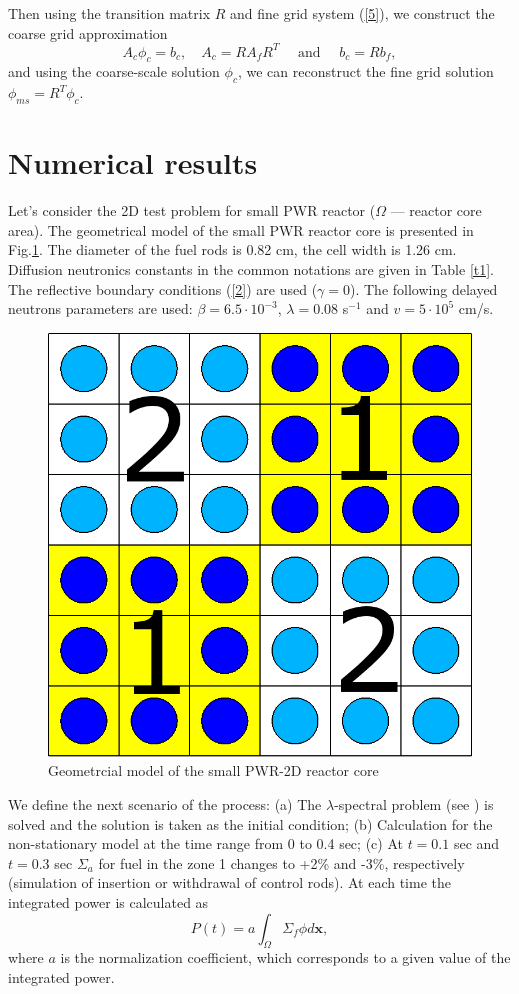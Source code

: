 \documentclass[runningheads]{llncs}
\begin{document}
Then using the transition matrix $R$ and fine grid system (\ref{5}), we construct the coarse grid approximation
\begin{equation}\label{9}
A_c \phi_c = b_c, \quad 
A_c = R A_f R^T 
\quad \text{ and } \quad 
b_c = R b_f,
\end{equation}  
and using the coarse-scale solution $\phi_c$, we can  reconstruct the fine grid solution $\phi_{ms} = R^T \phi_c$.

\section{Numerical results}
Let's consider the 2D test problem for small PWR reactor ($\Omega$ --- reactor core area). 
The geometrical model of the small PWR reactor core is presented in Fig.\ref{p3}. 
The diameter of the fuel rods is 0.82 cm, the cell width is 1.26 cm.
Diffusion neutronics constants in the common notations are given in Table \ref{t1}. 
The reflective boundary conditions (\ref{2}) are used ($\gamma = 0$).
The following delayed neutrons parameters are used: $\beta = 6.5 \cdot 10^{-3}$, $\lambda = 0.08$ s$^{-1}$ and $v = 5 \cdot 10^5$ cm/s.

\begin{figure}[h]
  \begin{center}
    \includegraphics[width=0.4\linewidth] {smallpwr.png}
	\caption{Geometrcial model of the small PWR-2D reactor core}
	\label{p3}
  \end{center}
\end{figure} 

We define the next scenario of the process: (a) The $\lambda$-spectral problem (see \cite{Annals17}) is solved and the solution is taken as the initial condition; (b)
Calculation for the non-stationary model at the time range from 0 to 0.4 sec; (c)
At $t=0.1$ sec and $t=0.3$ sec $\Sigma_a$ for fuel in the zone 1 changes to +2\% and -3\%, respectively (simulation of insertion or withdrawal of control rods).
At each time the integrated power is calculated as
\[P(t) = a\int_{\Omega}\Sigma_f \phi d\bm x,\]
where $a$ is the normalization coefficient, which corresponds to a given value of the integrated power.
\end{document}
